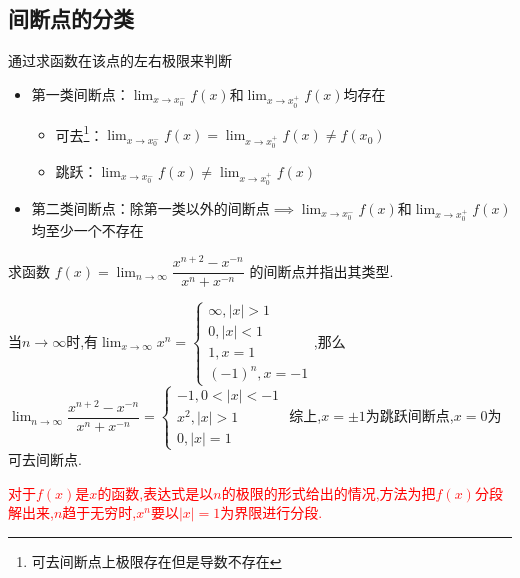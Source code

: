 \documentclass[8pt a4paper, oneside, UTF8]{ctexbook}
\begin{document}
\begin{sloppypar}
    \subsection{间断点的分类}
    通过求函数在该点的左右极限来判断
    \begin{itemize}
        \item 第一类间断点：$\lim _ { x \rightarrow x _ { 0 } ^{-}} f ( x )$​ 和$\lim _ { x \rightarrow x _ { 0 }^ {+}} f ( x )$​ 均存在
              \begin{itemize}
                  \item 可去\footnote{可去间断点上极限存在但是导数不存在}：$\lim _ { x \rightarrow x_0 ^ { - } } f ( x ) = \lim _ { x \rightarrow x_0^{+} } f  ( x ) \neq f(x_0)$
                  \item 跳跃：$\lim _ { x \rightarrow x_0^{-} } f ( x ) \not= \lim _ { x \rightarrow x_0^{+} } f ( x )$
              \end{itemize}
        \item 第二类间断点：除第一类以外的间断点$\implies \lim _ { x \rightarrow x _ { 0 } ^{-}} f ( x )$和$\lim _ { x \rightarrow x _ { 0 }^ {+}} f ( x )$​ 均至少一个不存在
    \end{itemize}
    \begin{problem}
        求函数 $f(x)=\lim_{n\to\infty}\dfrac{x^{n+2}-x^{-n}}{x^n+x^{-n}}$ 的间断点并指出其类型.
    \end{problem}
    \begin{solution}
        当$n \to \infty$时,有$\lim_{x \to \infty}x^n=\begin{cases}
            \infty ,|x|>1\\ 
            0,|x|<1\\1,
            x=1\\
            (-1)^n,x=-1
        \end{cases}$,那么$\lim_{n\to\infty}\dfrac{x^{n+2}-x^{-n}}{x^n+x^{-n}}=
        \begin{cases} 
            -1,0<|x|<-1\\x^2,|x|>1\\0,|x|=1
        \end{cases}$
    综上,$x= \pm 1$为跳跃间断点,$x=0$为可去间断点.
    \end{solution}
    \begin{note}
        \textcolor{red}{对于$f(x)$是$x$的函数,表达式是以$n$的极限的形式给出的情况,方法为把$f(x)$分段解出来,$n$趋于无穷时,$x^n$要以$|x|=1$为界限进行分段.}
    \end{note}
    \begin{problem}

\end{problem}
\end{sloppypar}
\end{document}
